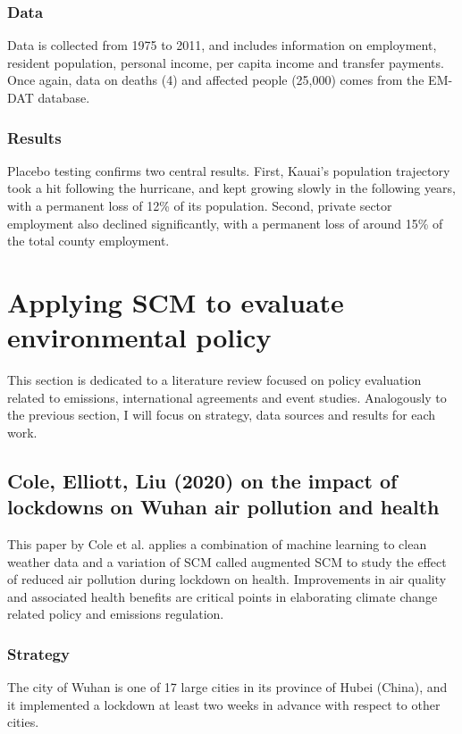 \documentclass[12pt,a4paper,draft]{article}
\begin{document}
\subsubsection{Data}
Data is collected from 1975 to 2011, and includes information on employment, resident 
population, personal income, per capita income and transfer payments.  
Once again, data on deaths (4) and affected people (25,000) comes from the EM-DAT 
database.

\subsubsection{Results}
Placebo testing confirms two central results. 
First, Kauai's population trajectory took a hit following the hurricane, and kept 
growing slowly in the following years, with a permanent loss of 12\% of its population.
Second, private sector employment also declined significantly, with a permanent loss 
of around 15\% of the total county employment. 



\section{Applying SCM to evaluate environmental policy}   %
This section is dedicated to a literature review focused on policy evaluation related 
to emissions, international agreements and event studies. Analogously to the previous 
section, I will focus on strategy, data sources and results for each work. 


\subsection{Cole, Elliott, Liu (2020) on the impact of lockdowns on Wuhan air pollution and health}
This paper by Cole et al. applies a combination of machine learning 
to clean weather data and a variation of SCM called augmented SCM to study the effect 
of reduced air pollution during lockdown on health. 
Improvements in air quality and associated health benefits are critical points in 
elaborating climate change related policy and emissions regulation. 


\subsubsection{Strategy} %
The city of Wuhan is one of 17 large cities in its province of Hubei (China), and it 
implemented a lockdown at least two weeks in advance with respect to other cities. 
\end{document}
